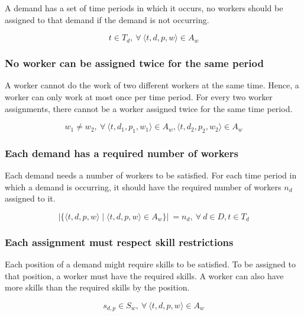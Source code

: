 \documentclass[../thesis.tex]{subfiles}
\begin{document}
A demand has a set of time periods in which it occurs,
no workers should be assigned to that demand if the demand is not 
occurring. 

\begin{equation*}
  t \in T_d, \ \forall \ \langle t, d, p, w\rangle \in A_w
\end{equation*}

\subsubsection{No worker can be assigned twice for the same period} 

A worker cannot do the work of two different workers at the same time.
Hence, a worker can only work at most once per time period.
For every two worker assignments, there cannot be a worker assigned twice for the same time period.

\begin{equation*}
  w_1 \neq w_2, \ \forall \ \langle t, d_1, p_1, w_1\rangle \in A_w,  \langle t, d_2, p_2, w_2\rangle \in A_w
\end{equation*}

\subsubsection{Each demand has a required number of workers}

Each demand needs a number of workers to be satisfied. 
For each time period in which a demand is occurring, it should have the required 
number of workers $n_d$ assigned to it.

\begin{equation*}
  |\{ \langle t, d, p, w\rangle \mid \langle t, d, p, w\rangle \in A_w \}| \ = n_d, \ \forall \ d \in D, t \in T_d
\end{equation*}



\subsubsection{Each assignment must respect skill restrictions}

Each position of a demand might require skills to be satisfied. 
To be assigned to that position, a worker must have the required skills. 
A worker can also have more skills than the required skills by the position.

\begin{equation*}
  s_{d,p} \in S_w, \ \forall \ \langle t, d, p, w\rangle \in A_w
\end{equation*}
\end{document}
